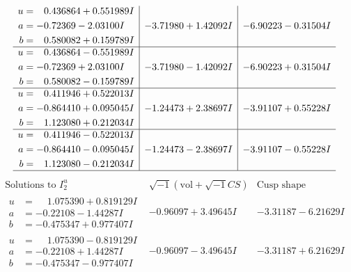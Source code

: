 \documentclass[1p]{elsarticle_modified}
\theoremstyle{definition}
\newcommand{\I}{\sqrt{-1}}
\begin{document}
$$\begin{array}{c|c|c}
\begin{aligned}
u &= \phantom{-}0.436864 + 0.551989 I \\
a &= -0.72369 - 2.03100 I \\
b &= \phantom{-}0.580082 + 0.159789 I\end{aligned}
 & -3.71980 + 1.42092 I & -6.90223 - 0.31504 I \\ \hline\begin{aligned}
u &= \phantom{-}0.436864 - 0.551989 I \\
a &= -0.72369 + 2.03100 I \\
b &= \phantom{-}0.580082 - 0.159789 I\end{aligned}
 & -3.71980 - 1.42092 I & -6.90223 + 0.31504 I \\ \hline\begin{aligned}
u &= \phantom{-}0.411946 + 0.522013 I \\
a &= -0.864410 + 0.095045 I \\
b &= \phantom{-}1.123080 + 0.212034 I\end{aligned}
 & -1.24473 + 2.38697 I & -3.91107 + 0.55228 I \\ \hline\begin{aligned}
u &= \phantom{-}0.411946 - 0.522013 I \\
a &= -0.864410 - 0.095045 I \\
b &= \phantom{-}1.123080 - 0.212034 I\end{aligned}
 & -1.24473 - 2.38697 I & -3.91107 - 0.55228 I\\
 \hline 
 \end{array}$$\newpage$$\begin{array}{c|c|c}  
\text{Solutions to }I^u_{2}& \I (\text{vol} + \sqrt{-1}CS) & \text{Cusp shape}\\
 \hline 
\begin{aligned}
u &= \phantom{-}1.075390 + 0.819129 I \\
a &= -0.22108 - 1.44287 I \\
b &= -0.475347 + 0.977407 I\end{aligned}
 & -0.96097 + 3.49645 I & -3.31187 - 6.21629 I \\ \hline\begin{aligned}
u &= \phantom{-}1.075390 - 0.819129 I \\
a &= -0.22108 + 1.44287 I \\
b &= -0.475347 - 0.977407 I\end{aligned}
 & -0.96097 - 3.49645 I & -3.31187 + 6.21629 I \\ \hline\begin{aligned}

\end{aligned}
\end{array}$$
\end{document}
